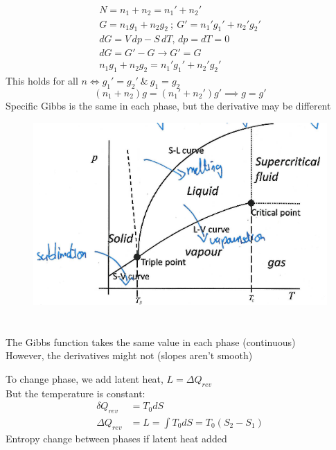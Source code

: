 \documentclass[a4paper, 11pt, normalem]{report}
\begin{document}
\begin{gather*}
    N = n_1 + n_2 = n_{1}' + n_{2}' \\
    G = n_1 g_1 + n_2 g_2 ~;~ G' = n_{1}' g_{1}' + n_{2}' g_{2}' \\
    dG = V\,dp - S\,dT,\, dp = dT = 0 \\
    dG = G' - G \to G' = G \\
    n_1 g_1 + n_2 g_2 = n_{1}' g_{1}' + n_{2}' g_{2}'
\end{gather*}
This holds for all $n \iff g_{1}' = g_{2}' ~\&~ g_1 = g_2$
\begin{equation*}
    (n_1 + n_2)g = (n_{1}' + n_{2}')g' \implies g = g'
\end{equation*}
Specific Gibbs is the same in each phase, but the derivative may be different
\begin{figure}[H]
    \centering
    \includegraphics[scale=0.5]{Phasez.png}
\end{figure}

\chapter{}
The Gibbs function takes the same value in each phase (continuous) \\
However, the derivatives might not (slopes aren't smooth)

To change phase, we add latent heat, $L = \Delta Q_{rev}$ \\
But the temperature is constant:
\begin{align*}
    \delta Q_{rev} &= T_0 dS \\
    \Delta Q_{rev} &= L = \int T_0 dS = T_0 (S_2 - S_1)
\end{align*}
Entropy change between phases if latent heat added
\end{document}
